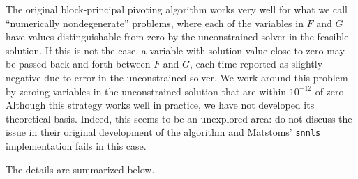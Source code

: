 \documentclass[acmtoms,acmnow,aps,floatfix]{acmtrans2m}
\newcommand{\snnls}{\texttt{snnls} }
\begin{document}
The original block-principal pivoting algorithm works very well for what we call ``numerically nondegenerate'' problems, where each of the variables in $F$ and $G$ have values distinguishable from zero by the unconstrained solver in the feasible solution. If this is not the case, a variable with solution value close to zero may be passed back and forth between $F$ and $G$, each time reported as slightly negative due to error in the unconstrained solver. We work around this problem by zeroing variables in the unconstrained solution that are within $10^{\mathord{-}12}$ of zero. Although this strategy works well in practice, we have not developed its theoretical basis. Indeed, this seems to be an unexplored area: \cite{MR95a:90059} do not discuss the issue in their original development of the algorithm and Matstoms' \snnls implementation fails in this case.

The details are summarized below.
\end{document}
